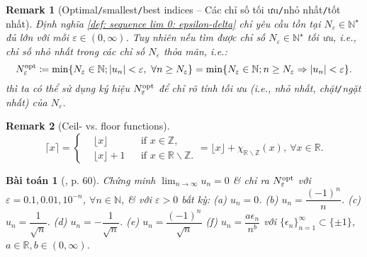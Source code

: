 \documentclass{article}
\newtheorem{baitoan}{Bài toán}
\newtheorem{remark}{Remark}
\begin{document}
\begin{remark}[Optimal{\tt/}smallest{\tt/}best indices -- Các chỉ số tối ưu{\tt/}nhỏ nhất{\tt/}tốt nhất]
	Định nghĩa \ref{def: sequence lim 0: epsilon-delta} chỉ yêu cầu tồn tại $N_\varepsilon\in\mathbb{N}^\star$ đủ lớn với mỗi $\varepsilon\in(0,\infty)$. Tuy nhiên nếu tìm được chỉ số $N_\varepsilon\in\mathbb{N}^\star$ tối ưu, i.e., chỉ số nhỏ nhất trong các chỉ số $N_\varepsilon$ thỏa mãn, i.e.:
	\begin{equation*}
		N_\varepsilon^{\rm opt}\coloneqq\min\{N_\varepsilon\in\mathbb{N};|u_n| < \varepsilon,\ \forall n\ge N_\varepsilon\} = \min\{N_\varepsilon\in\mathbb{N};n\ge N_\varepsilon\Rightarrow|u_n| < \varepsilon\}.
	\end{equation*}
	thì ta có thể sử dụng ký hiệu $N_\varepsilon^{\rm opt}$ để chỉ rõ tính tối ưu (i.e., nhỏ nhất, chặt{\tt/}ngặt nhất) của $N_\varepsilon$.
\end{remark}

\begin{remark}[Ceil- vs. floor functions]
	\begin{equation*}
		\lceil x\rceil = \left\{\begin{split}
			&\lfloor x\rfloor&&\mbox{if } x\in\mathbb{Z},\\
			&\lfloor x\rfloor + 1&&\mbox{if } x\in\mathbb{R}\backslash\mathbb{Z}.
		\end{split}\right. = \lfloor x\rfloor + \chi_{\mathbb{R}\backslash\mathbb{Z}}(x),\ \forall x\in\mathbb{R}.
	\end{equation*}
\end{remark}

\begin{baitoan}[\cite{SGK_Toan_11_CD_tap_1}, p. 60]
	Chứng minh $\lim_{n\to\infty} u_n = 0$ \& chỉ ra $N_\varepsilon^{\rm opt}$ với $\varepsilon = 0.1,0.01,10^{-n}$, $\forall n\in\mathbb{N}$, \& với $\varepsilon > 0$ bất kỳ: (a) $u_n = 0$. (b) $u_n = \dfrac{(-1)^n}{n}$. (c) $u_n = \dfrac{1}{\sqrt{n}}$. (d) $u_n = -\dfrac{1}{\sqrt{n}}$. (e) $u_n = \dfrac{(-1)^n}{\sqrt{n}}$ (f) $u_n = \dfrac{a\epsilon_n}{n^b}$ với $\{\epsilon_n\}_{n=1}^\infty\subset\{\pm1\}$, $a\in\mathbb{R},b\in(0,\infty)$.
\end{baitoan}
\end{document}
